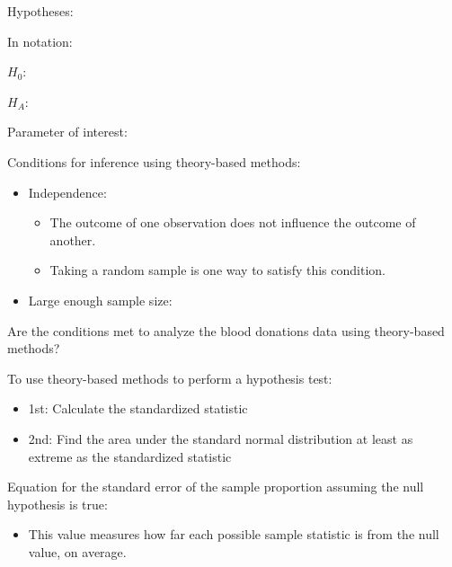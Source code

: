 \documentclass[
]{report}
\providecommand{\tightlist}{%
  \setlength{\itemsep}{0pt}\setlength{\parskip}{0pt}}
\begin{document}
Hypotheses:

In notation:

\(H_0:\)

\vspace{0.2in}

\(H_A:\)

\vspace{0.2in}

Parameter of interest:

\vspace{0.6in}

Conditions for inference using theory-based methods:

\begin{itemize}
\item
  Independence:

  \begin{itemize}
  \tightlist
  \item
    The outcome of one observation does not influence the outcome of another.
  \item
    Taking a random sample is one way to satisfy this condition.
  \end{itemize}
\item
  Large enough sample size:
\end{itemize}

\vspace{1in}

Are the conditions met to analyze the blood donations data using theory-based methods?

\vspace{1in}

To use theory-based methods to perform a hypothesis test:

\begin{itemize}
\item
  1st: Calculate the standardized statistic
\item
  2nd: Find the area under the standard normal distribution at least as extreme as the standardized statistic
\end{itemize}

Equation for the standard error of the sample proportion assuming the null hypothesis is true:

\vspace{0.5in}


\begin{itemize}
\tightlist
\item
  This value measures how far each possible sample statistic is from the null value, on average.
\end{itemize}
\end{document}

